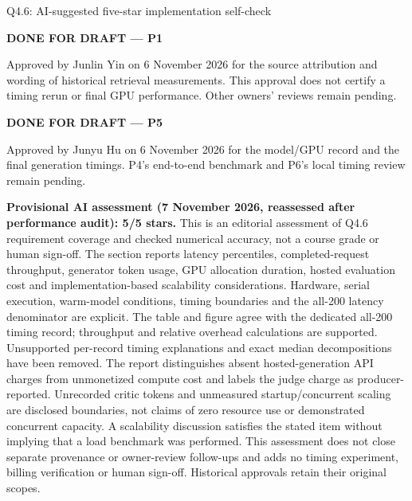\begin{review}{Q4.6: AI-suggested five-star implementation self-check}
\colorbox{yellow!45}{\strut\textbf{DONE FOR DRAFT --- P1}}\par
Approved by Junlin Yin on 6 November 2026 for the source attribution and wording of historical retrieval measurements. This approval does not certify a timing rerun or final GPU performance. Other owners' reviews remain pending.\par\smallskip
\colorbox{yellow!45}{\strut\textbf{DONE FOR DRAFT --- P5}}\par
Approved by Junyu Hu on 6 November 2026 for the model/GPU record and the final generation timings. P4's end-to-end benchmark and P6's local timing review remain pending.\par\smallskip
{}\quad\textbf{Provisional AI assessment (7 November 2026, reassessed after performance audit): 5/5 stars.} This is an editorial assessment of Q4.6 requirement coverage and checked numerical accuracy, not a course grade or human sign-off. The section reports latency percentiles, completed-request throughput, generator token usage, GPU allocation duration, hosted evaluation cost and implementation-based scalability considerations. Hardware, serial execution, warm-model conditions, timing boundaries and the all-200 latency denominator are explicit. The table and figure agree with the dedicated all-200 timing record; throughput and relative overhead calculations are supported. Unsupported per-record timing explanations and exact median decompositions have been removed. The report distinguishes absent hosted-generation API charges from unmonetized compute cost and labels the judge charge as producer-reported. Unrecorded critic tokens and unmeasured startup/concurrent scaling are disclosed boundaries, not claims of zero resource use or demonstrated concurrent capacity. A scalability discussion satisfies the stated item without implying that a load benchmark was performed. This assessment does not close separate provenance or owner-review follow-ups and adds no timing experiment, billing verification or human sign-off. Historical approvals retain their original scopes.
\end{review}
